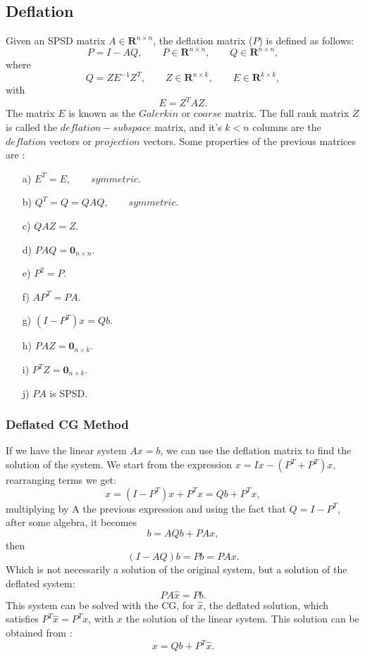 \documentclass[12pt]{report}
\begin{document}
\subsection{Deflation}
Given an SPSD matrix $A \in \mathbf{R}^{n \times n}$, the deflation matrix ($P$) is defined as follows:
$$P=I-AQ, \qquad P \in \mathbf{R}^{n \times n}, \qquad Q \in \mathbf{R}^{n \times n},$$
where
$$Q=ZE^{-1}Z^T, \qquad Z \in \mathbf{R}^{n \times k}, \qquad E \in \mathbf{R}^{k \times k}, $$
with
$$E=Z^TAZ.$$
The matrix $E$ is known as the $Galerkin$ or $coarse$ matrix. The full rank matrix $Z$ is called the $deflation-subspace$ matrix, 
and it's $k<n$ columns are the
$deflation$ vectors or $projection$ vectors.
Some properties of the previous matrices are \cite{Tang08} :
\begin{enumerate}
 \item[a)] $E^T=E, \qquad symmetric.$
 \item[b)] $Q^T=Q=QAQ, \qquad symmetric.$
 \item[c)] $QAZ=Z.$
 \item[d)] $PAQ=\mathbf{0}_{n\times n}.$
 \item[e)] $P^2=P.$
 \item[f)] $AP^T=PA.$
 \item[g)] $(I-P^T)x=Qb.$
 \item[h)] $PAZ=\mathbf{0}_{n\times k}.$
 \item[i)] $P^TZ=\mathbf{0}_{n\times k}.$
 \item[j)] $PA$ is SPSD. 
\end{enumerate}

\subsubsection{Deflated CG Method}
If we have the linear system $Ax=b$, we can use the deflation matrix to find the solution of the system. We start from 
the expression $x=Ix-(P^{T}+P^{T})x$, rearranging terms we get:
$$x=(I-P^T)x+P^Tx=Qb+P^Tx, $$
multiplying by A the previous expression and using the fact that $Q=I-P^{T}$, after some algebra, it becomes
$$b=AQb+PAx,$$
then
$$(I-AQ)b=Pb=PAx.$$
Which is not necessarily a solution of the original system, but a solution of the deflated system:
$$PA\hat{x}=Pb.$$
This system can be solved with the CG, for $\hat{x}$, the deflated solution, which satisfies $P^T\hat{x}=P^Tx$, with $x$ the solution of the linear system.
This solution can be obtained from \cite{Tang08}:
$$x=Qb+P^T\hat{x}.$$
\end{document}
